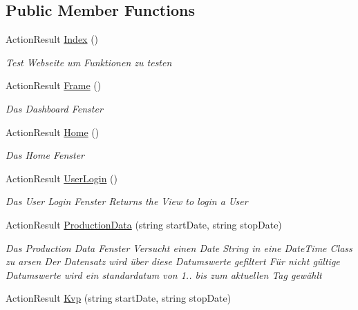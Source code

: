 \subsection*{Public Member Functions}
\begin{DoxyCompactItemize}
\item 
Action\+Result \hyperlink{classkpi_mvc_api_1_1_controllers_1_1_home_controller_a10e3c3151fdc896f23d1ed374bdcd6cf}{Index} ()
\begin{DoxyCompactList}\small\item\em Test Webseite um Funktionen zu testen \end{DoxyCompactList}\item 
Action\+Result \hyperlink{classkpi_mvc_api_1_1_controllers_1_1_home_controller_a8fe51f06ec9db44e1766f89691af44f6}{Frame} ()
\begin{DoxyCompactList}\small\item\em Das Dashboard Fenster \end{DoxyCompactList}\item 
Action\+Result \hyperlink{classkpi_mvc_api_1_1_controllers_1_1_home_controller_a71cc0c383f8e44677455f0caf590e0a7}{Home} ()
\begin{DoxyCompactList}\small\item\em Das Home Fenster \end{DoxyCompactList}\item 
Action\+Result \hyperlink{classkpi_mvc_api_1_1_controllers_1_1_home_controller_a52ba84d65a16f3ec9f7c18ef46313b23}{User\+Login} ()
\begin{DoxyCompactList}\small\item\em Das User Login Fenster Returns the View to login a User \end{DoxyCompactList}\item 
Action\+Result \hyperlink{classkpi_mvc_api_1_1_controllers_1_1_home_controller_ae5c2fcc4413eda2cab2775cd9819efca}{Production\+Data} (string start\+Date, string stop\+Date)
\begin{DoxyCompactList}\small\item\em Das Production Data Fenster Versucht einen Date String in eine Date\+Time Class zu arsen Der Datensatz wird über diese Datumswerte gefiltert Für nicht gültige Datumswerte wird ein standardatum von 1.. bis zum aktuellen Tag gewählt \end{DoxyCompactList}\item 
Action\+Result \hyperlink{classkpi_mvc_api_1_1_controllers_1_1_home_controller_aab951608121b90d9424bb58c68bd0b23}{Kvp} (string start\+Date, string stop\+Date)

\end{DoxyCompactItemize}
